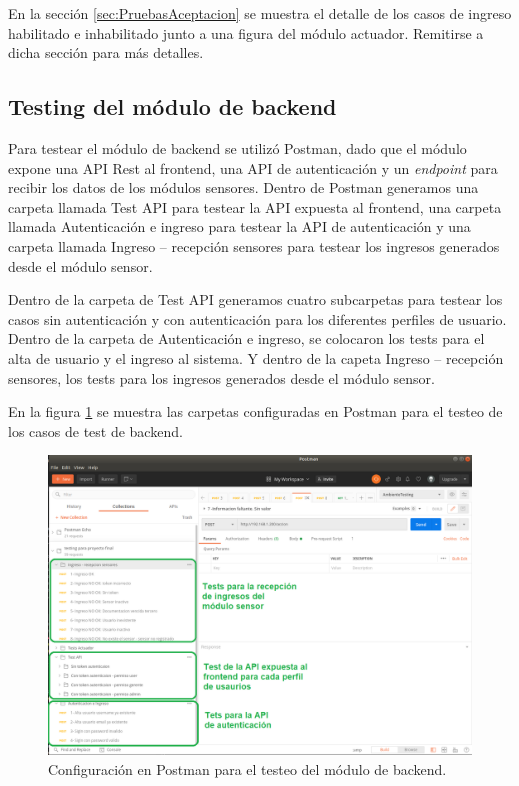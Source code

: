 En la sección \ref{sec:PruebasAceptacion} se muestra el detalle de los casos de ingreso habilitado e inhabilitado junto a una figura del módulo actuador. Remitirse a dicha sección para más detalles.


\subsection{Testing del módulo de backend}

Para testear el módulo de backend se utilizó Postman, dado que el módulo expone una API Rest al frontend, una API de autenticación y un \textit{endpoint} \citep{WEBSITE:Endpoints} para recibir los datos de los módulos sensores. Dentro de Postman generamos una carpeta llamada Test API para testear la API expuesta al frontend, una carpeta llamada Autenticación e ingreso para testear la API de autenticación y una carpeta llamada Ingreso – recepción sensores para testear los ingresos generados desde el módulo sensor.

Dentro de la carpeta de Test API generamos cuatro subcarpetas para testear los casos sin autenticación y con autenticación para los diferentes perfiles de usuario. Dentro de la carpeta de Autenticación e ingreso, se colocaron los tests para el alta de usuario y el ingreso al sistema. Y dentro de la capeta Ingreso – recepción sensores, los tests para los ingresos generados desde el módulo sensor.

En la figura \ref{fig:testsBackend} se muestra las carpetas configuradas en Postman para el testeo de los casos de test de backend.

\begin{figure}[h]
	\centering
	\includegraphics[width=1\textwidth]{./Figures/testsBackend.png}
	\caption{Configuración en Postman para el testeo del módulo de backend.}
	\label{fig:testsBackend}
\end{figure}


